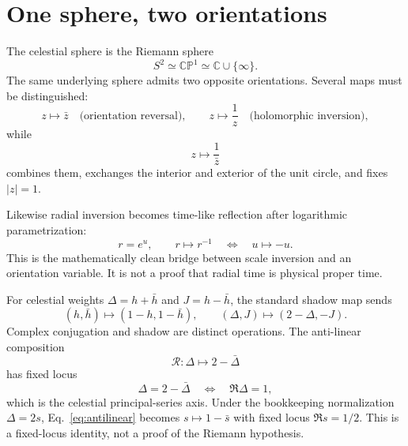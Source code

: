 \documentclass[11pt]{article}
\theoremstyle{definition}\newtheorem{definition}[theorem]{Definition}
\theoremstyle{remark}\newtheorem{remark}[theorem]{Remark}\newtheorem{conjecture}[theorem]{Conjecture}
\begin{document}
\section{One sphere, two orientations}\label{sec:onesphere}
The celestial sphere is the Riemann sphere
\begin{equation}
 S^2\simeq\mathbb{CP}^1\simeq\mathbb C\cup\{\infty\}.
\end{equation}
The same underlying sphere admits two opposite orientations. Several maps must be distinguished:
\begin{equation}
 z\mapsto \bar z \quad\text{(orientation reversal)},\qquad
 z\mapsto\frac1z \quad\text{(holomorphic inversion)},
\end{equation}
while
\begin{equation}
 z\mapsto\frac1{\bar z}
\end{equation}
combines them, exchanges the interior and exterior of the unit circle, and fixes $|z|=1$.

Likewise radial inversion becomes time-like reflection after logarithmic parametrization:
\begin{equation}
 r=e^u,\qquad r\mapsto r^{-1}\quad\Longleftrightarrow\quad u\mapsto-u.
\end{equation}
This is the mathematically clean bridge between scale inversion and an orientation variable. It is not a proof that radial time is physical proper time.

For celestial weights $\Delta=h+\bar h$ and $J=h-\bar h$, the standard shadow map sends
\begin{equation}
 (h,\bar h)\mapsto(1-h,1-\bar h),
 \qquad
 (\Delta,J)\mapsto(2-\Delta,-J).
\end{equation}
Complex conjugation and shadow are distinct operations. The anti-linear composition
\begin{equation}\label{eq:antilinear}
 \mathcal R:\Delta\mapsto2-\bar\Delta
\end{equation}
has fixed locus
\begin{equation}
 \Delta=2-\bar\Delta\quad\Longleftrightarrow\quad\Re\Delta=1,
\end{equation}
which is the celestial principal-series axis. Under the bookkeeping normalization $\Delta=2s$, Eq.~\eqref{eq:antilinear} becomes $s\mapsto1-\bar s$ with fixed locus $\Re s=1/2$. This is a fixed-locus identity, not a proof of the Riemann hypothesis.
\end{document}
